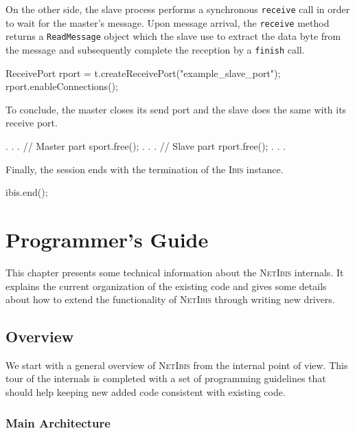 \documentclass[11pt]{book}
\def\Ibis{\textsc{Ibis}\xspace}
\def\NetIbis{\textsc{NetIbis}\xspace}
\begin{document}
On the other side, the slave process performs a synchronous
\texttt{receive} call in order to wait for the master's message. Upon
message arrival, the \texttt{receive} method returns a
\texttt{ReadMessage} object which the slave use to extract the data
byte from the message and subsequently complete the reception by a
\texttt{finish} call.
\begin{Miniverb}
        ReceivePort rport = t.createReceivePort("example_slave_port");
        rport.enableConnections();
\end{Miniverb}

To conclude, the master closes its send port and the slave does the
same with its receive port.
\begin{Miniverb}
    . . .
        // Master part
        sport.free();
    . . .
        // Slave  part
        rport.free();
    . . .
\end{Miniverb}

Finally, the session ends with the termination of the \Ibis instance.
\begin{Miniverb}
      ibis.end();
\end{Miniverb}


\chapter{Programmer's Guide}
\label{cha:programmers-guide}

This chapter presents some technical information about the \NetIbis
internals. It explains the current organization of the existing code
and gives some details about how to extend the functionality of
\NetIbis through writing new drivers.

\section{Overview}
\label{sec:overview}

We start with a general overview of \NetIbis from the internal point
of view. This tour of the internals is completed with a set of
programming guidelines that should help keeping new added code
consistent with existing code.

\subsection{Main Architecture}
\label{sec:main-architecture}
\end{document}
